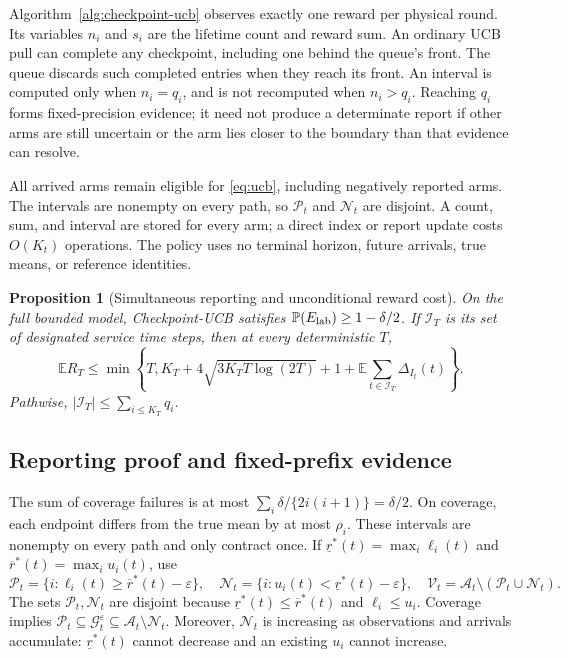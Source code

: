 \documentclass[11pt]{article}
\newtheorem{proposition}[theorem]{Proposition}
\theoremstyle{remark}
\newcommand{\E}{\mathbb E}
\newcommand{\Prob}{\mathbb P}
\begin{document}
Algorithm~\ref{alg:checkpoint-ucb} observes exactly one reward per physical
round. Its variables $n_i$ and $s_i$ are the lifetime count and reward sum.
An ordinary UCB pull can complete any checkpoint, including one behind the
queue's front. The queue discards such completed entries when they reach its
front. An interval is computed only when $n_i=q_i$, and is not recomputed
when $n_i>q_i$. Reaching $q_i$ forms fixed-precision evidence; it need not
produce a determinate report if other arms are still uncertain or the arm
lies closer to the boundary than that evidence can resolve.

All arrived arms remain eligible for \eqref{eq:ucb}, including negatively
reported arms. The intervals are nonempty on every path, so
$\mathcal P_t$ and $\mathcal N_t$ are disjoint. A count, sum, and interval
are stored for every arm; a direct index or report update costs $O(K_t)$
operations. The policy uses no terminal horizon, future arrivals, true means,
or reference identities.

\begin{proposition}[Simultaneous reporting and unconditional reward cost]
\label{prop:reporting}
On the full bounded model, Checkpoint-UCB satisfies
$\Prob(E_{\rm lab})\ge1-\delta/2$. If $\mathcal I_T$ is its set of designated
service time steps, then at every deterministic $T$,
\begin{equation}
 \E R_T\le\min\left\{T,K_T+4\sqrt{3K_TT\log(2T)}+1+
                \E\sum_{t\in\mathcal I_T}\Delta_{I_t}(t)\right\}.
 \label{eq:reward_bound}
\end{equation}
Pathwise, $|\mathcal I_T|\le\sum_{i\le K_T}q_i$.
\end{proposition}


\subsection{Reporting proof and fixed-prefix evidence}
The sum of coverage failures is at most
$\sum_i\delta/\{2i(i+1)\}=\delta/2$. On coverage, each endpoint differs from
the true mean by at most $\rho_i$. These intervals are nonempty on every path
and only contract once. If $\underline r^*(t)=\max_i\ell_i(t)$ and
$\overline r^*(t)=\max_i u_i(t)$, use
\[
 \mathcal P_t=\{i:\ell_i(t)\ge\overline r^*(t)-\varepsilon\},\quad
 \mathcal N_t=\{i:u_i(t)<\underline r^*(t)-\varepsilon\},\quad
 \mathcal V_t=\mathcal{A}_t\setminus(\mathcal P_t\cup \mathcal N_t).
\]
The sets $\mathcal P_t,\mathcal N_t$ are disjoint because
$\underline r^*(t)\le\overline r^*(t)$ and $\ell_i\le u_i$.
Coverage implies
$\mathcal P_t\subseteq \mathcal G_t^\varepsilon\subseteq \mathcal{A}_t\setminus \mathcal N_t$.
Moreover, $\mathcal N_t$ is increasing as observations and arrivals accumulate:
$\underline r^*(t)$ cannot decrease and an existing $u_i$ cannot increase.
\end{document}
